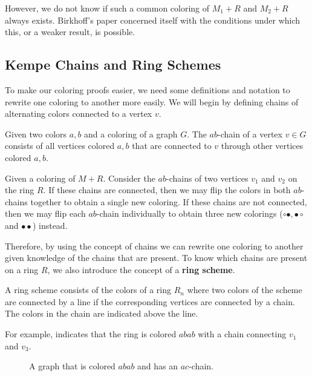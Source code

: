 However, we do not know if such a common coloring of $M_1+R$ and $M_2+R$ always exists. Birkhoff's paper concerned itself with the conditions under which this, or a weaker result, is possible.

\subsection{Kempe Chains and Ring Schemes}

To make our coloring proofs easier, we need some definitions and notation to rewrite one coloring to another more easily. We will begin by defining chains of alternating colors connected to a vertex $v$.

\begin{definition}
    Given two colors $a,b$ and a coloring of a graph $G$. The $ab$-chain of a vertex $v \in G$ consists of all vertices colored $a,b$ that are connected to $v$ through other vertices colored $a,b$.
\end{definition}

Given a coloring of $M+R$. Consider the $ab$-chains of two vertices $v_1$ and $v_2$ on the ring $R$. If these chains are connected, then we may flip the colors in both $ab$-chains together to obtain a single new coloring. If these chains are not connected, then we may flip each $ab$-chain individually to obtain three new colorings ($\circ \bullet, \bullet \circ$ and $ \bullet \bullet$) instead.

Therefore, by using the concept of chains we can rewrite one coloring to another given knowledge of the chains that are present. To know which chains are present on a ring $R$, we also introduce the concept of a \textbf{ring scheme}.

\begin{definition}
    A ring scheme consists of the colors of a ring $R_n$ where two colors of the scheme are connected by a line if the corresponding vertices are connected by a chain. The colors in the chain are indicated above the line.
\end{definition}

For example,  indicates that the ring is colored $abab$ with a chain connecting $v_1$ and $v_3$.

\begin{figure}[!ht]
    \centering
    
    \caption{A graph that is colored $abab$ and has an $ac$-chain.}
\end{figure}

